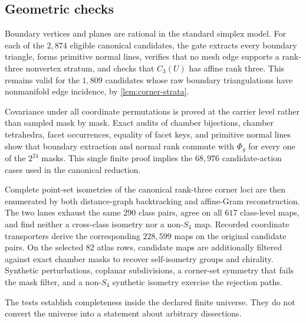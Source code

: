 \subsection{Geometric checks}

Boundary vertices and planes are rational in the standard simplex model.
For each of the $2{,}874$ eligible canonical candidates, the gate extracts
every boundary triangle, forms primitive normal lines, verifies that no mesh
edge supports a rank-three nonvertex stratum, and checks that $C_3(U)$ has
affine rank three.  This remains valid for the $1{,}809$ candidates whose raw
boundary triangulations have nonmanifold edge incidence, by
\cref{lem:corner-strata}.

Covariance under all coordinate permutations is proved at the carrier level
rather than sampled mask by mask.  Exact audits of chamber bijections,
chamber tetrahedra, facet occurrences, equality of facet keys, and primitive
normal lines show that boundary extraction and normal rank commute with
$\Phi_g$ for every one of the $2^{24}$ masks.  This single finite proof
implies the $68{,}976$ candidate-action cases used in the canonical
reduction.

Complete point-set isometries of the canonical rank-three corner loci are
then enumerated by both distance-graph backtracking and affine-Gram
reconstruction.  The two lanes exhaust the same $290$ class pairs, agree on
all $617$ class-level maps, and find neither a cross-class isometry nor a
non-$S_4$ map.  Recorded coordinate transporters derive the corresponding
$228{,}599$ maps on the original candidate pairs.  On the selected $82$
atlas rows, candidate maps are additionally filtered against exact chamber
masks to recover self-isometry groups and chirality.  Synthetic
perturbations, coplanar subdivisions, a corner-set symmetry that fails the
mask filter, and a non-$S_4$ synthetic isometry exercise the rejection paths.

The tests establish completeness inside the declared finite universe.  They
do not convert the universe into a statement about arbitrary dissections.
